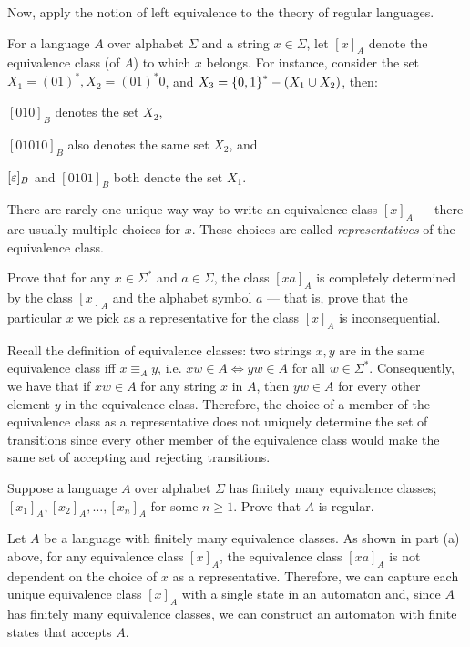 \begin{problem}
  Now, apply the notion of left equivalence to the theory
  of regular languages.

  \begin{enumalph}
    \item For a language $A$ over alphabet $\Sigma$ and a string $x \in \Sigma$,
      let $[x]_A$ denote the equivalence class (of $A$) to which $x$ belongs.
      For instance, consider the set $X_1 = (01)^*, X_2 = (01)^*0$,
      and $X_3 = \left\{0, 1\right\}^* - (X_1 \cup X_2)$, then:
      \begin{enumroman}
        \item $[010]_{B}$ denotes the set $X_2$,
        \item $[01010]_{B}$ also denotes the same set $X_2$, and
        \item $[\varepsilon]_B$ and $[0101]_B$ both denote the set $X_1$.
      \end{enumroman}

      \step
      There are rarely one unique way way to write an equivalence class
      $[x]_A$ --- there are usually multiple choices for $x$.
      These choices are called \emph{representatives}
      of the equivalence class.

      \step
      Prove that for any $x \in \Sigma^*$ and $a \in \Sigma$,
      the class $[xa]_A$ is completely determined by the class $[x]_A$
      and the alphabet symbol $a$ ---
      that is, prove that the particular $x$ we pick as a representative
      for the class $[x]_A$ is inconsequential.
      \begin{Answer}
        Recall the definition of equivalence classes:
        two strings $x, y$ are in the same equivalence class iff
        $x \equiv_A y$, i.e. $xw \in A \iff yw \in A$ for all $w \in \Sigma^*$.
        Consequently, we have that if $xw \in A$ for any string $x$ in $A$,
        then $yw \in A$ for every other element $y$ in the equivalence class.
        Therefore, the choice of a member of the equivalence class as a
        representative does not uniquely determine the set of transitions
        since every other member of the equivalence class would make the
        same set of accepting and rejecting transitions.
      \end{Answer}

    \item Suppose a language $A$ over alphabet $\Sigma$ has finitely many
      equivalence classes; $[x_1]_A, [x_2]_A, \ldots, [x_n]_A$ for some
      $n \ge 1$. Prove that $A$ is regular.
      \begin{Answer}
        Let $A$ be a language with finitely many equivalence classes.
        As shown in part (a) above, for any equivalence class
        $[x]_A$, the equivalence class $[xa]_A$ is not dependent on the
        choice of $x$ as a representative.
        Therefore, we can capture each unique equivalence class
        $[x]_A$ with a single state in an automaton and,
        since $A$ has finitely many equivalence classes,
        we can construct an automaton with finite states that accepts $A$.
      \end{Answer}
  \end{enumalph}
\end{problem}
